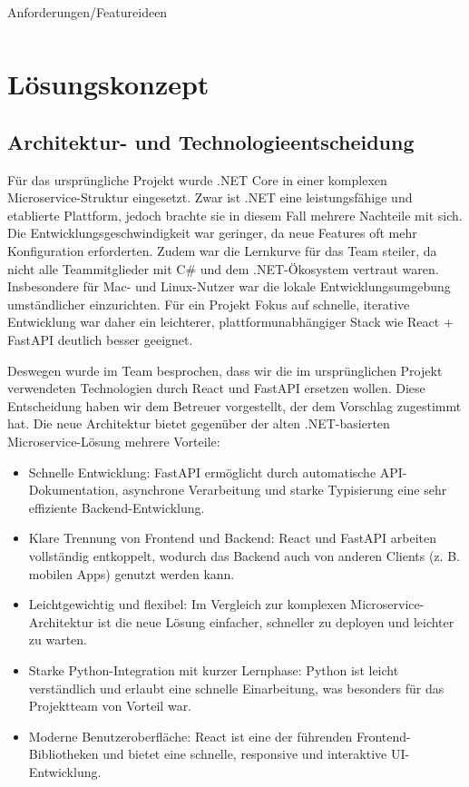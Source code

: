\documentclass[oneside]{ausarbeitung}
\begin{document}
\begin{table}[htbp]
\begin{tabular}{|p{7cm}|p{7cm}|}
\\ \hline
\end{tabular}
\caption{Anforderungen/Featureideen}
\label{tab:anforderungen}
\end{table}


\chapter{Lösungskonzept}
\label{cha:loesungskonzept}

\section{Architektur- und Technologieentscheidung}
Für das ursprüngliche Projekt wurde .NET Core in einer komplexen Microservice-Struktur eingesetzt. Zwar ist .NET eine leistungsfähige und etablierte Plattform, jedoch brachte sie in diesem Fall mehrere Nachteile mit sich. Die Entwicklungsgeschwindigkeit war geringer, da neue Features oft mehr Konfiguration erforderten. Zudem war die Lernkurve für das Team steiler, da nicht alle Teammitglieder mit C\# und dem .NET-Ökosystem vertraut waren. Insbesondere für Mac- und Linux-Nutzer war die lokale Entwicklungsumgebung umständlicher einzurichten. Für ein Projekt Fokus auf schnelle, iterative Entwicklung war daher ein leichterer, plattformunabhängiger Stack wie React + FastAPI deutlich besser geeignet.

Deswegen wurde im Team besprochen, dass wir die im ursprünglichen Projekt verwendeten Technologien durch React und FastAPI ersetzen wollen. Diese Entscheidung haben wir dem Betreuer vorgestellt, der dem Vorschlag zugestimmt hat.
Die neue Architektur bietet gegenüber der alten .NET-basierten Microservice-Lösung mehrere Vorteile:

\begin{itemize}
    \item Schnelle Entwicklung: FastAPI ermöglicht durch automatische API-Dokumentation, asynchrone Verarbeitung und starke Typisierung eine sehr effiziente Backend-Entwicklung.
    \item Klare Trennung von Frontend und Backend: React und FastAPI arbeiten vollständig entkoppelt, wodurch das Backend auch von anderen Clients (z. B. mobilen Apps) genutzt werden kann.
    \item Leichtgewichtig und flexibel: Im Vergleich zur komplexen Microservice-Architektur ist die neue Lösung einfacher, schneller zu deployen und leichter zu warten.
    \item Starke Python-Integration mit kurzer Lernphase: Python ist leicht verständlich und erlaubt eine schnelle Einarbeitung, was besonders für das Projektteam von Vorteil war.
    \item Moderne Benutzeroberfläche: React ist eine der führenden Frontend-Bibliotheken und bietet eine schnelle, responsive und interaktive UI-Entwicklung.
\end{itemize}
\end{document}

